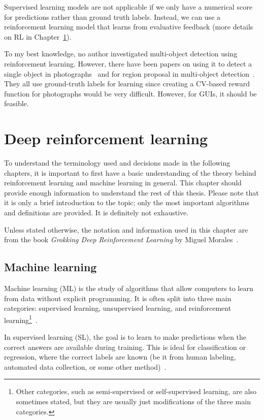 \documentclass[
  digital,     %
  oneside,     %
  nosansbold,  %
  nocolorbold, %
  lof,         %
  lot,         %
]{fithesis4}
\begin{document}
Supervised learning models are not applicable if we only have a numerical score for predictions rather than ground truth labels. Instead, we can use a reinforcement learning model that learns from evaluative feedback (more details on RL in Chapter~\ref{ch:dlr}).

To my best knowledge, no author investigated multi-object detection using reinforcement learning. However, there have been papers on using it to detect a single object in photographs~\cite{dlr_object_detection, iterative_od_with_rl, hierarchical_od_with_drl} and for region proposal in multi-object detection~\cite{drl_rpn}. They all use ground-truth labels for learning since creating a CV-based reward function for photographs would be very difficult. However, for GUIs, it should be feasible. 

\chapter{Deep reinforcement learning}
\label{ch:dlr}

To understand the terminology used and decisions made in the following chapters, it is important to first have a basic understanding of the theory behind reinforcement learning and machine learning in general. This chapter should provide enough information to understand the rest of this thesis. Please note that it is only a brief introduction to the topic; only the most important algorithms and definitions are provided. It is definitely not exhaustive.

Unless stated otherwise, the notation and information used in this chapter are from the book \textit{Grokking Deep Reinforcement Learning} by Miguel Morales~\cite{GDRL}.

\section{Machine learning}
Machine learning (ML) is the study of algorithms that allow computers to learn from data without explicit programming. It is often split into three main categories: supervised learning, unsupervised learning, and reinforcement learning\footnote{Other categories, such as semi-supervised or self-supervised learning, are also sometimes stated, but they are usually just modifications of the three main categories.}~\cite{IB031}.

In supervised learning (SL), the goal is to learn to make predictions when the correct answers are available during training. This is ideal for classification or regression, where the correct labels are known (be it from human labeling, automated data collection, or some other method)~\cite{IB031}.
\end{document}
